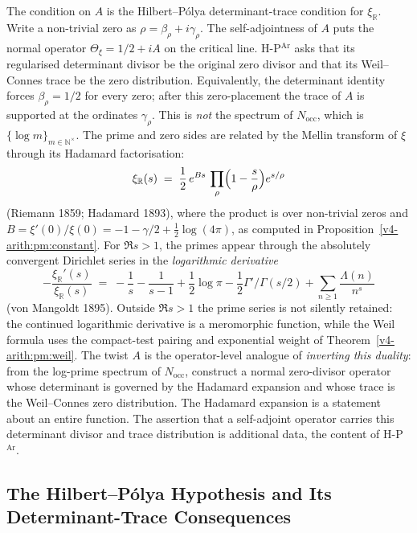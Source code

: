 The condition on \(A\) is the Hilbert--P\'olya determinant-trace
condition for \(\xi_{\mathbb R}\). Write a non-trivial zero as
\(\rho=\beta_{\rho}+i\gamma_{\rho}\). The self-adjointness of \(A\)
puts the normal operator \(\Theta_{\xi}=1/2+iA\) on the critical line.
H-P\(^{\mathrm{Ar}}\) asks that its regularised determinant divisor be
the original zero divisor and that its Weil--Connes trace be the zero
distribution. Equivalently, the determinant identity forces
\(\beta_{\rho}=1/2\) for every zero; after this zero-placement the
trace of \(A\) is supported at the ordinates \(\gamma_{\rho}\). This is
\emph{not} the spectrum of \(N_{\mathrm{occ}}\), which is
\(\{\log m\}_{m\in\mathbb{N}^{\times}}\). The prime and zero sides are
related by the Mellin transform of \(\xi\) through its Hadamard
factorisation:
\begin{equation}
\label{v4-arith:w5-b:eq:hadamard}
\xi_{\mathbb R}(s)\;=\;\frac{1}{2}\,e^{B s}\,\prod_{\rho}\Bigl(1-\frac{s}{\rho}\Bigr)e^{s/\rho}
\end{equation}
(Riemann 1859; Hadamard 1893), where the product is over non-trivial
zeros and $B=\xi'(0)/\xi(0)=-1-\gamma/2+\tfrac12\log(4\pi)$,
as computed in Proposition~\ref{v4-arith:pm:constant}.
For $\Re s>1$, the primes appear through the absolutely convergent
Dirichlet series in the \emph{logarithmic derivative}
\begin{equation}
\label{v4-arith:w5-b:eq:log-deriv-xi}
-\frac{\xi_{\mathbb R}'(s)}{\xi_{\mathbb R}(s)}\;=\;-\frac{1}{s}-\frac{1}{s-1}+\frac{1}{2}\log\pi-\frac{1}{2}\Gamma'/\Gamma(s/2)+\sum_{n\geq1}\frac{\Lambda(n)}{n^{s}}
\end{equation}
(von Mangoldt 1895). Outside $\Re s>1$ the prime series is not
silently retained: the continued logarithmic derivative is a
meromorphic function, while the Weil formula uses the compact-test
pairing and exponential weight of Theorem~\ref{v4-arith:pm:weil}. The twist \(A\) is the operator-level analogue of
\emph{inverting this duality}: from the log-prime spectrum of
\(N_{\mathrm{occ}}\), construct a normal zero-divisor operator whose
determinant is governed by the Hadamard expansion and whose trace is
the Weil--Connes zero distribution. The Hadamard expansion is a
statement about an entire function. The assertion that a self-adjoint
operator carries this determinant divisor and trace distribution is
additional data, the content of H-P\(^{\mathrm{Ar}}\).

\subsection{The Hilbert--P\'olya Hypothesis and Its Determinant-Trace Consequences}
\label{v4-arith:w5-b:twist:consequences}

